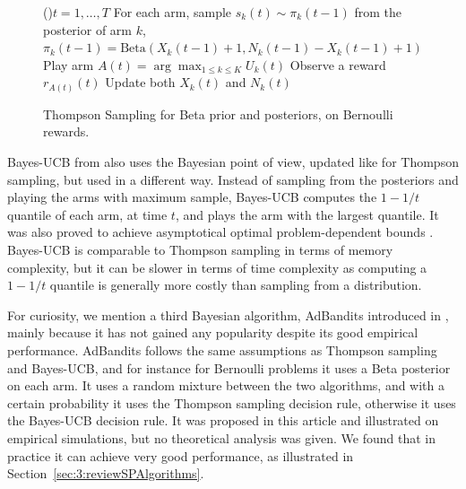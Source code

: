 \begin{figure}[h!]
	\centering
    \begin{framed}
	\begin{algorithm}[H]
		\For(){$t = 1, \dots, T$}{
            For each arm, sample $s_k(t) \sim \pi_k(t-1)$ from the posterior of arm $k$, $\pi_k(t-1)=\mathrm{Beta}(X_k(t-1)+1,N_k(t-1)-X_k(t-1)+1)$\;
            Play arm $A(t) = \arg\max_{1\leq k \leq K} U_k(t)$\;
            Observe a reward $r_{A(t)}(t)$\;
            Update both $X_k(t)$ and $N_k(t)$\;
		}
		\caption{Thompson Sampling for Beta prior and posteriors, on Bernoulli rewards.}
		\label{algo:2:ThompsonSampling}
	\end{algorithm}
	\end{framed}
\end{figure}


Bayes-UCB from \cite{Kaufmann12BUCB} also uses the Bayesian point of view, updated like for Thompson sampling, but used in a different way.
Instead of sampling from the posteriors and playing the arms with maximum sample, Bayes-UCB computes the $1-1/t$ quantile of each arm, at time $t$, and plays the arm with the largest quantile.
It was also proved to achieve asymptotical optimal problem-dependent bounds \cite{Kaufmann12BUCB}.
%
Bayes-UCB is comparable to Thompson sampling in terms of memory complexity, but it can be slower in terms of time complexity as computing a $1-1/t$ quantile is generally more costly than sampling from a distribution.

For curiosity, we mention a third Bayesian algorithm, AdBandits introduced in \cite{Truzzi13}, mainly because it has not gained any popularity despite its good empirical performance.
AdBandits follows the same assumptions as Thompson sampling and Bayes-UCB, and for instance for Bernoulli problems it uses a Beta posterior on each arm.
It uses a random mixture between the two algorithms, and with a certain probability it uses the Thompson sampling decision rule, otherwise it uses the Bayes-UCB decision rule.
It was proposed in this article \cite{Truzzi13} and illustrated on empirical simulations, but no theoretical analysis was given.
We found that in practice it can achieve very good performance, as illustrated in Section~\ref{sec:3:reviewSPAlgorithms}.


